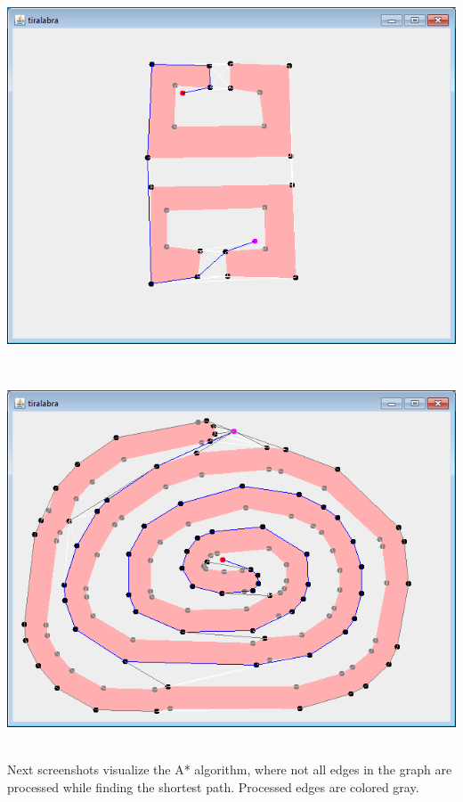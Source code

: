 \documentclass[a4paper,12pt]{article}
\begin{document}
\centerline{\includegraphics[scale=0.75]{example06.png}} \hspace*{\fill} \\
\centerline{\includegraphics[scale=0.75]{example07.png}} \hspace*{\fill} \\
Next screenshots visualize the A* algorithm, where not all edges in the graph are processed while finding the shortest path. Processed edges are colored gray.\\
\end{document}
